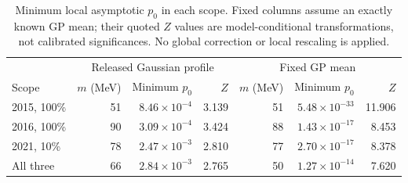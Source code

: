 \begin{table}[H]\centering\small
\setlength{\tabcolsep}{5pt}
\begin{tabular}{lrrrrrr}\toprule
 & \multicolumn{3}{c}{Released Gaussian profile} & \multicolumn{3}{c}{Fixed GP mean}\\
Scope & $m$ (MeV) & Minimum $p_0$ & $Z$ & $m$ (MeV) & Minimum $p_0$ & $Z$\\\midrule
2015, 100\% & 51 & $8.46\times10^{-4}$ & 3.139 & 51 & $5.48\times10^{-33}$ & 11.906\\
2016, 100\% & 90 & $3.09\times10^{-4}$ & 3.424 & 88 & $1.43\times10^{-17}$ & 8.453\\
2021, 10\% & 78 & $2.47\times10^{-3}$ & 2.810 & 77 & $2.70\times10^{-17}$ & 8.378\\
All three & 66 & $2.84\times10^{-3}$ & 2.765 & 50 & $1.27\times10^{-14}$ & 7.620\\
\bottomrule\end{tabular}
\caption{Minimum local asymptotic $p_0$ in each scope. Fixed columns assume an exactly known GP mean; their quoted $Z$ values are model-conditional transformations, not calibrated significances. No global correction or local rescaling is applied.}
\label{tab:pzero}\end{table}
